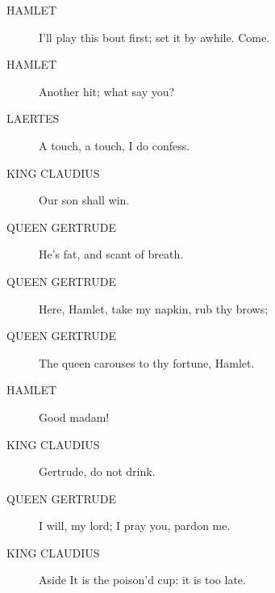 \documentclass{article}
\begin{document}
\begin{description}
            
\item[HAMLET] I'll play this bout first; set it by awhile. Come.
\item[HAMLET] Another hit; what say you?
\end{description}
          
\begin{description}
            
\item[LAERTES] A touch, a touch, I do confess.
\end{description}
          
\begin{description}
            
\item[KING CLAUDIUS] Our son shall win.
\end{description}
          
\begin{description}
            
\item[QUEEN GERTRUDE] He's fat, and scant of breath.
\item[QUEEN GERTRUDE] Here, Hamlet, take my napkin, rub thy brows;
\item[QUEEN GERTRUDE] The queen carouses to thy fortune, Hamlet.
\end{description}
          
\begin{description}
            
\item[HAMLET] Good madam!
\end{description}
          
\begin{description}
            
\item[KING CLAUDIUS] Gertrude, do not drink.
\end{description}
          
\begin{description}
            
\item[QUEEN GERTRUDE] I will, my lord; I pray you, pardon me.
\end{description}
          
\begin{description}
            
\item[KING CLAUDIUS] 
               Aside  It is the poison'd cup: it is too late.
\end{description}
          
\end{document}
